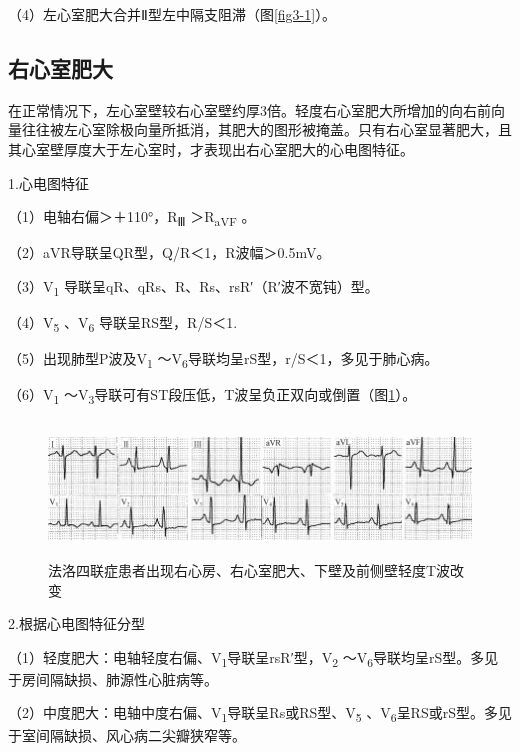 （4）左心室肥大合并Ⅱ型左中隔支阻滞（图\ref{fig3-1}）。

\protect\hypertarget{text00009.htmlux5cux23subid41}{}{}

\subsection{右心室肥大}

在正常情况下，左心室壁较右心室壁约厚3倍。轻度右心室肥大所增加的向右前向量往往被左心室除极向量所抵消，其肥大的图形被掩盖。只有右心室显著肥大，且其心室壁厚度大于左心室时，才表现出右心室肥大的心电图特征。

1.心电图特征

（1）电轴右偏＞＋110°，R\textsubscript{Ⅲ} ＞R\textsubscript{aVF} 。

（2）aVR导联呈QR型，Q/R＜1，R波幅＞0.5mV。

（3）V\textsubscript{1} 导联呈qR、qRs、R、Rs、rsR′（R′波不宽钝）型。

（4）V\textsubscript{5} 、V\textsubscript{6} 导联呈RS型，R/S＜1.

（5）出现肺型P波及V\textsubscript{1} ～V\textsubscript{6}导联均呈rS型，r/S＜1，多见于肺心病。

（6）V\textsubscript{1} ～V\textsubscript{3}导联可有ST段压低，T波呈负正双向或倒置（图\ref{fig3-3}）。

\begin{figure}[!htbp]
 \centering
 \includegraphics[width=5.78125in,height=1.40625in]{./images/Image00052.jpg}
 \captionsetup{justification=centering}
 \caption{法洛四联症患者出现右心房、右心室肥大、下壁及前侧壁轻度T波改变}
 \label{fig3-3}
  \end{figure} 

2.根据心电图特征分型

（1）轻度肥大：电轴轻度右偏、V\textsubscript{1}导联呈rsR′型，V\textsubscript{2} ～V\textsubscript{6}导联均呈rS型。多见于房间隔缺损、肺源性心脏病等。

（2）中度肥大：电轴中度右偏、V\textsubscript{1}导联呈Rs或RS型、V\textsubscript{5} 、V\textsubscript{6}呈RS或rS型。多见于室间隔缺损、风心病二尖瓣狭窄等。


